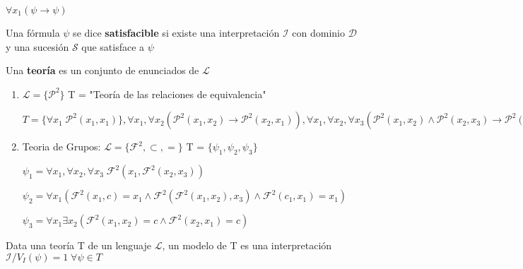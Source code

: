 \begin{example}

$\forall x_1 (\psi \rightarrow \psi)$

\end{example}

\begin{definition}

Una f\'ormula $\psi$ se dice \textbf{satisfacible} si existe una interpretaci\'on $\mathcal{I}$ con dominio $\mathcal{D}$ y una sucesi\'on $\mathcal{S}$ que satisface a $\psi$

\end{definition}

\begin{definition}

Una \textbf{teor\'ia} es un conjunto de enunciados de $\mathcal{L}$

\end{definition}

\begin{example}

\begin{enumerate}
	\item $\mathcal{L} = \{ \mathcal{P}^{2}\}$  T = "Teor\'ia de las relaciones de equivalencia"

$T = \{ \forall x_1 \; \mathcal{P}^2(x_1, x_1)\}, \forall x_1, \forall x_2 (\mathcal{P}^2(x_1, x_2) \rightarrow \mathcal{P}^2(x_2, x_1)), \forall x_1, \forall x_2, \forall x_3 (\mathcal{P}^2(x_1, x_2) \land \mathcal{P}^2(x_2, x_3) \rightarrow \mathcal{P}^2(x_1, x_3))$

	\item Teoria de Grupos: $\mathcal{L} = \{ \mathcal{F}^2, \subset, = \}$ T = $\{ \psi_1, \psi_2, \psi_3 \}$
	
$\psi_1 = \forall x_1, \forall x_2, \forall x_3 \; \mathcal{F}^2(x_1, \mathcal{F}^2(x_2, x_3))$

$\psi_2 = \forall x_1 (\mathcal{F}^2(x_1, c) = x_1 \land \mathcal{F}^2(\mathcal{F}^2(x_1, x_2), x_3) \land \mathcal{F}^2(c_1, x_1) = x_1)$

$\psi_3 = \forall x_1 \exists x_2( \mathcal{F}^2(x_1, x_2) = c \land \mathcal{F}^2(x_2, x_1) = c)$
\end{enumerate}

\end{example}

\begin{definition}

Data una teor\'ia T de un lenguaje $\mathcal{L}$, un modelo de T es una interpretaci\'on $\mathcal{I} / V_I(\psi) = 1 \; \forall \psi \in T$

\end{definition}